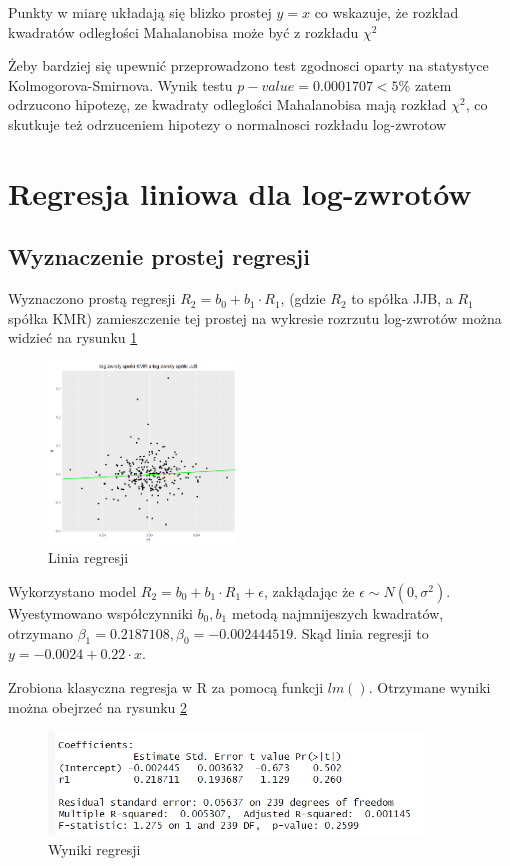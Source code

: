 \documentclass[a4paper,11pt]{article}
\def\\{\hfill\break}
\begin{document}
Punkty w miarę układają się blizko prostej $y = x$ co wskazuje, że rozkład kwadratów odległości Mahalanobisa może być z rozkładu $ \chi^2$

\\
Żeby bardziej się upewnić przeprowadzono test zgodnosci oparty na statystyce Kolmogorova-Smirnova. Wynik testu $p-value = 0.0001707 < 5\%$ zatem odrzucono hipotezę, ze kwadraty odleglości Mahalanobisa mają rozkład $ \chi^2$, co skutkuje też odrzuceniem hipotezy o normalnosci rozkładu log-zwrotow

\section{Regresja liniowa dla log-zwrotów}
\subsection{Wyznaczenie prostej regresji}

Wyznaczono prostą regresji $R_{2} = b_{0} + b_{1} \cdot R_{1}$, (gdzie $R_2$ to spółka JJB, a $R_1$ spółka KMR) zamieszczenie tej prostej na wykresie rozrzutu log-zwrotów można widzieć na rysunku  \ref{fig:linia_regresji}

\begin{figure}[!htb]
	\centering
	\includegraphics[width=5cm]{images/linia_regresji.png}
	\caption{Linia regresji }
         \label{fig:linia_regresji}
\end{figure}

Wykorzystano model $R_{2} = b_{0} + b_{1} \cdot R_{1} + \epsilon $, zakłądając że $\epsilon \sim N(0, \sigma^2)$. Wyestymowano współczynniki $b_{0}, b_{1}$ metodą najmnijeszych kwadratów, otrzymano $\beta_{1} = 0.2187108, \beta_{0}=-0.002444519$. Skąd linia regresji to $y = -0.0024 + 0.22\cdot x$.

Zrobiona klasyczna regresja w R za pomocą funkcji $lm()$. Otrzymane wyniki można obejrzeć na rysunku \ref{fig:regresja}

\begin{figure}[!htb]
	\centering
	\includegraphics[width=10cm]{images/regresja.png}
	\caption{Wyniki regresji}
         \label{fig:regresja}
\end{figure}
\end{document}
